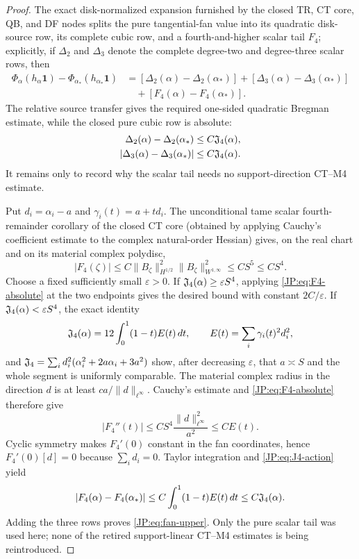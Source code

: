\begin{proof}
The exact disk-normalized expansion furnished by the closed TR, CT core,
QB, and DF nodes splits the pure tangential-fan value into its quadratic
disk-source row, its complete cubic row, and a fourth-and-higher scalar
tail $F_4$; explicitly, if $\Delta_2$ and $\Delta_3$ denote the complete
degree-two and degree-three scalar rows, then
\begin{align*}
 \Phi_\alpha(h_\alpha\mathbf1)
 -\Phi_{\alpha_*}(h_{\alpha_*}\mathbf1)
 &=[\Delta_2(\alpha)-\Delta_2(\alpha_*)]
   +[\Delta_3(\alpha)-\Delta_3(\alpha_*)]\\
 &\quad+[F_4(\alpha)-F_4(\alpha_*)].
\end{align*}
The relative source transfer gives the required one-sided quadratic
Bregman estimate, while the closed pure cubic row is absolute:
\begin{align*}
 \Delta_2(\alpha)-\Delta_2(\alpha_*)&\le C\mathfrak J_4(\alpha),\\
 |\Delta_3(\alpha)-\Delta_3(\alpha_*)|&\le C\mathfrak J_4(\alpha).
\end{align*}
It remains only to record why the scalar tail needs no support-direction
CT--M4 estimate.

Put $d_i=\alpha_i-a$ and
$\gamma_i(t)=a+td_i$.  The unconditional tame scalar fourth-remainder
corollary of the closed CT core (obtained by applying Cauchy's coefficient
estimate to the complex natural-order Hessian) gives, on the real chart
and on its material complex polydisc,
\begin{equation}\label{JP:eq:F4-absolute}
 |F_4(\zeta)|
 \le C\|B_\zeta\|_{H^{1/2}}^2
        \|B_\zeta\|_{W^{1,\infty}}^2
 \le CS^5\le CS^4.
\end{equation}
Choose a fixed sufficiently small $\varepsilon>0$.  If
$\mathfrak J_4(\alpha)\ge\varepsilon S^4$, applying
\eqref{JP:eq:F4-absolute} at the two endpoints gives the desired bound with
constant $2C/\varepsilon$.  If
$\mathfrak J_4(\alpha)<\varepsilon S^4$, the exact identity
\begin{equation}\label{JP:eq:J4-action}
 \mathfrak J_4(\alpha)
 =12\int_0^1(1-t)E(t)\,dt,
 \qquad E(t)=\sum_i\gamma_i(t)^2d_i^2,
\end{equation}
and
\(
 \mathfrak J_4=\sum_i d_i^2(\alpha_i^2+2a\alpha_i+3a^2)
\)
show, after decreasing $\varepsilon$, that
$a\asymp S$ and the whole segment is uniformly comparable.  The material
complex radius in the direction $d$ is at least
$ca/\|d\|_{\ell^\infty}$.  Cauchy's estimate and
\eqref{JP:eq:F4-absolute} therefore give
\[
 |F_4''(t)|
 \le CS^4\frac{\|d\|_{\ell^\infty}^2}{a^2}
 \le C E(t).
\]
Cyclic symmetry makes $F_4'(0)$ constant in the fan coordinates, hence
$F_4'(0)[d]=0$ because $\sum_i d_i=0$.  Taylor integration and
\eqref{JP:eq:J4-action} yield
\[
 |F_4(\alpha)-F_4(\alpha_*)|
 \le C\int_0^1(1-t)E(t)\,dt
 \le C\mathfrak J_4(\alpha).
\]
Adding the three rows proves \eqref{JP:eq:fan-upper}.  Only the pure scalar
tail was used here; none of the retired support-linear CT--M4 estimates is
being reintroduced.
\end{proof}

